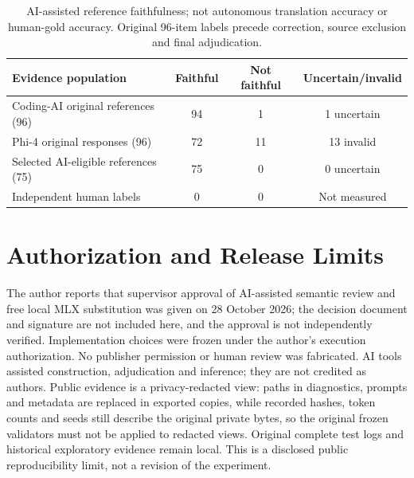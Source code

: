 \documentclass[runningheads,a4paper]{llncs}
\begin{document}
\begin{table}[tbp]
\caption{AI-assisted reference faithfulness; not autonomous translation accuracy or
human-gold accuracy. Original 96-item labels precede correction, source exclusion
and final adjudication.}
\label{tab:faith}
\centering\small
\begin{tabular}{lccc}
\toprule
Evidence population & Faithful & Not faithful & Uncertain/invalid\\
\midrule
Coding-AI original references (96)   & 94 & 1  & 1 uncertain\\
Phi-4 original responses (96)        & 72 & 11 & 13 invalid\\
Selected AI-eligible references (75) & 75 & 0  & 0 uncertain\\
Independent human labels             & 0  & 0  & Not measured\\
\bottomrule
\end{tabular}
\end{table}

\section{Authorization and Release Limits}
The author reports that supervisor approval of AI-assisted semantic review and free
local MLX substitution was given on 28 October 2026; the decision document and
signature are not included here, and the approval is not independently verified.
Implementation choices were frozen under the author's execution authorization. No
publisher permission or human review was fabricated. AI tools assisted construction,
adjudication and inference; they are not credited as authors. Public evidence is a
privacy-redacted view: paths in diagnostics, prompts and metadata are replaced in
exported copies, while recorded hashes, token counts and seeds still describe the
original private bytes, so the original frozen validators must not be applied to
redacted views. Original complete test logs and historical exploratory evidence
remain local. This is a disclosed public reproducibility limit, not a revision of
the experiment.
\end{document}
